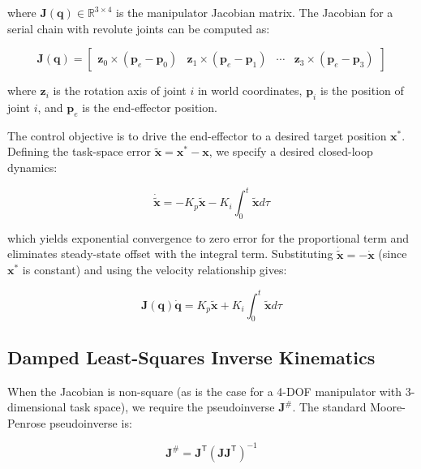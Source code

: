 \documentclass[12pt,a4paper,oneside]{report}
\begin{document}
where $\mathbf{J}(\mathbf{q}) \in \mathbb{R}^{3 \times 4}$ is the manipulator Jacobian matrix. The Jacobian for a serial chain with revolute joints can be computed as:

\begin{equation}
\mathbf{J}(\mathbf{q}) = \begin{bmatrix}
\mathbf{z}_0 \times (\mathbf{p}_e - \mathbf{p}_0) & \mathbf{z}_1 \times (\mathbf{p}_e - \mathbf{p}_1) & \cdots & \mathbf{z}_3 \times (\mathbf{p}_e - \mathbf{p}_3)
\end{bmatrix}
\end{equation}

where $\mathbf{z}_i$ is the rotation axis of joint $i$ in world coordinates, $\mathbf{p}_i$ is the position of joint $i$, and $\mathbf{p}_e$ is the end-effector position.

The control objective is to drive the end-effector to a desired target position $\mathbf{x}^*$. Defining the task-space error $\tilde{\mathbf{x}} = \mathbf{x}^* - \mathbf{x}$, we specify a desired closed-loop dynamics:

\begin{equation}
\dot{\tilde{\mathbf{x}}} = -K_p \tilde{\mathbf{x}} - K_i \int_0^t \tilde{\mathbf{x}} d\tau
\end{equation}

which yields exponential convergence to zero error for the proportional term and eliminates steady-state offset with the integral term. Substituting $\dot{\tilde{\mathbf{x}}} = -\dot{\mathbf{x}}$ (since $\mathbf{x}^*$ is constant) and using the velocity relationship gives:

\begin{equation}
\mathbf{J}(\mathbf{q}) \dot{\mathbf{q}} = K_p \tilde{\mathbf{x}} + K_i \int_0^t \tilde{\mathbf{x}} d\tau
\end{equation}

\subsection{Damped Least-Squares Inverse Kinematics}

When the Jacobian is non-square (as is the case for a 4-DOF manipulator with 3-dimensional task space), we require the pseudoinverse $\mathbf{J}^{\#}$. The standard Moore-Penrose pseudoinverse is:

\begin{equation}
\mathbf{J}^{\#} = \mathbf{J}^{\mathsf{T}} (\mathbf{J} \mathbf{J}^{\mathsf{T}})^{-1}
\end{equation}
\end{document}
